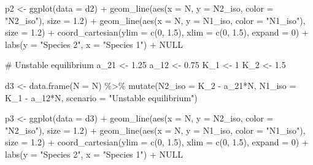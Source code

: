 \documentclass[
  letterpaper,
  DIV=11,
  numbers=noendperiod]{scrartcl}
\newenvironment{Shaded}{\begin{snugshade}}{\end{snugshade}}
\newcommand{\AttributeTok}[1]{\textcolor[rgb]{0.40,0.45,0.13}{#1}}
\newcommand{\CommentTok}[1]{\textcolor[rgb]{0.37,0.37,0.37}{#1}}
\newcommand{\ConstantTok}[1]{\textcolor[rgb]{0.56,0.35,0.01}{#1}}
\newcommand{\DecValTok}[1]{\textcolor[rgb]{0.68,0.00,0.00}{#1}}
\newcommand{\FloatTok}[1]{\textcolor[rgb]{0.68,0.00,0.00}{#1}}
\newcommand{\FunctionTok}[1]{\textcolor[rgb]{0.28,0.35,0.67}{#1}}
\newcommand{\NormalTok}[1]{\textcolor[rgb]{0.00,0.23,0.31}{#1}}
\newcommand{\OtherTok}[1]{\textcolor[rgb]{0.00,0.23,0.31}{#1}}
\newcommand{\SpecialCharTok}[1]{\textcolor[rgb]{0.37,0.37,0.37}{#1}}
\newcommand{\StringTok}[1]{\textcolor[rgb]{0.13,0.47,0.30}{#1}}
\begin{document}
\begin{Shaded}
\begin{Highlighting}[]
\NormalTok{p2 }\OtherTok{\textless{}{-}} \FunctionTok{ggplot}\NormalTok{(}\AttributeTok{data =}\NormalTok{ d2) }\SpecialCharTok{+}
  \FunctionTok{geom\_line}\NormalTok{(}\FunctionTok{aes}\NormalTok{(}\AttributeTok{x =}\NormalTok{ N, }\AttributeTok{y =}\NormalTok{ N2\_iso, }\AttributeTok{color =} \StringTok{"N2\_iso"}\NormalTok{), }\AttributeTok{size =} \FloatTok{1.2}\NormalTok{) }\SpecialCharTok{+}
  \FunctionTok{geom\_line}\NormalTok{(}\FunctionTok{aes}\NormalTok{(}\AttributeTok{x =}\NormalTok{ N, }\AttributeTok{y =}\NormalTok{ N1\_iso, }\AttributeTok{color =} \StringTok{"N1\_iso"}\NormalTok{), }\AttributeTok{size =} \FloatTok{1.2}\NormalTok{) }\SpecialCharTok{+}
  \FunctionTok{coord\_cartesian}\NormalTok{(}\AttributeTok{ylim =} \FunctionTok{c}\NormalTok{(}\DecValTok{0}\NormalTok{, }\FloatTok{1.5}\NormalTok{), }\AttributeTok{xlim =} \FunctionTok{c}\NormalTok{(}\DecValTok{0}\NormalTok{, }\FloatTok{1.5}\NormalTok{), }\AttributeTok{expand =} \DecValTok{0}\NormalTok{) }\SpecialCharTok{+}
  \FunctionTok{labs}\NormalTok{(}\AttributeTok{y =} \StringTok{"Species 2"}\NormalTok{, }\AttributeTok{x =} \StringTok{"Species 1"}\NormalTok{) }\SpecialCharTok{+}
  \ConstantTok{NULL}

\CommentTok{\# Unstable equilibrium}
\NormalTok{a\_21 }\OtherTok{\textless{}{-}} \FloatTok{1.25}
\NormalTok{a\_12 }\OtherTok{\textless{}{-}} \FloatTok{0.75}
\NormalTok{K\_1 }\OtherTok{\textless{}{-}} \DecValTok{1}
\NormalTok{K\_2 }\OtherTok{\textless{}{-}} \FloatTok{1.5}

\NormalTok{d3 }\OtherTok{\textless{}{-}} \FunctionTok{data.frame}\NormalTok{(}\AttributeTok{N =}\NormalTok{ N) }\SpecialCharTok{\%\textgreater{}\%} 
  \FunctionTok{mutate}\NormalTok{(}\AttributeTok{N2\_iso =}\NormalTok{ K\_2 }\SpecialCharTok{{-}}\NormalTok{ a\_21}\SpecialCharTok{*}\NormalTok{N,}
         \AttributeTok{N1\_iso =}\NormalTok{ K\_1 }\SpecialCharTok{{-}}\NormalTok{ a\_12}\SpecialCharTok{*}\NormalTok{N,}
         \AttributeTok{scenario =} \StringTok{"Unstable equilibrium"}\NormalTok{)}

\NormalTok{p3 }\OtherTok{\textless{}{-}} \FunctionTok{ggplot}\NormalTok{(}\AttributeTok{data =}\NormalTok{ d3) }\SpecialCharTok{+}
  \FunctionTok{geom\_line}\NormalTok{(}\FunctionTok{aes}\NormalTok{(}\AttributeTok{x =}\NormalTok{ N, }\AttributeTok{y =}\NormalTok{ N2\_iso, }\AttributeTok{color =} \StringTok{"N2\_iso"}\NormalTok{), }\AttributeTok{size =} \FloatTok{1.2}\NormalTok{) }\SpecialCharTok{+}
  \FunctionTok{geom\_line}\NormalTok{(}\FunctionTok{aes}\NormalTok{(}\AttributeTok{x =}\NormalTok{ N, }\AttributeTok{y =}\NormalTok{ N1\_iso, }\AttributeTok{color =} \StringTok{"N1\_iso"}\NormalTok{), }\AttributeTok{size =} \FloatTok{1.2}\NormalTok{) }\SpecialCharTok{+}
  \FunctionTok{coord\_cartesian}\NormalTok{(}\AttributeTok{ylim =} \FunctionTok{c}\NormalTok{(}\DecValTok{0}\NormalTok{, }\FloatTok{1.5}\NormalTok{), }\AttributeTok{xlim =} \FunctionTok{c}\NormalTok{(}\DecValTok{0}\NormalTok{, }\FloatTok{1.5}\NormalTok{), }\AttributeTok{expand =} \DecValTok{0}\NormalTok{) }\SpecialCharTok{+}
  \FunctionTok{labs}\NormalTok{(}\AttributeTok{y =} \StringTok{"Species 2"}\NormalTok{, }\AttributeTok{x =} \StringTok{"Species 1"}\NormalTok{) }\SpecialCharTok{+}
  \ConstantTok{NULL}


\end{Highlighting}
\end{Shaded}
\end{document}
